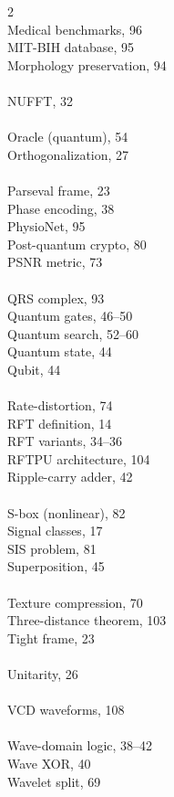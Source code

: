 \documentclass[11pt, a4paper, openany]{book}
\theoremstyle{definition}
\begin{document}
\begin{multicols}{2}
\\
Medical benchmarks, 96 \\
MIT-BIH database, 95 \\
Morphology preservation, 94 \\
\\
NUFFT, 32 \\
\\
Oracle (quantum), 54 \\
Orthogonalization, 27 \\
\\
Parseval frame, 23 \\
Phase encoding, 38 \\
PhysioNet, 95 \\
Post-quantum crypto, 80 \\
PSNR metric, 73 \\
\\
QRS complex, 93 \\
Quantum gates, 46--50 \\
Quantum search, 52--60 \\
Quantum state, 44 \\
Qubit, 44 \\
\\
Rate-distortion, 74 \\
RFT definition, 14 \\
RFT variants, 34--36 \\
RFTPU architecture, 104 \\
Ripple-carry adder, 42 \\
\\
S-box (nonlinear), 82 \\
Signal classes, 17 \\
SIS problem, 81 \\
Superposition, 45 \\
\\
Texture compression, 70 \\
Three-distance theorem, 103 \\
Tight frame, 23 \\
\\
Unitarity, 26 \\
\\
VCD waveforms, 108 \\
\\
Wave-domain logic, 38--42 \\
Wave XOR, 40 \\
Wavelet split, 69 \\
\end{multicols}
\end{document}

